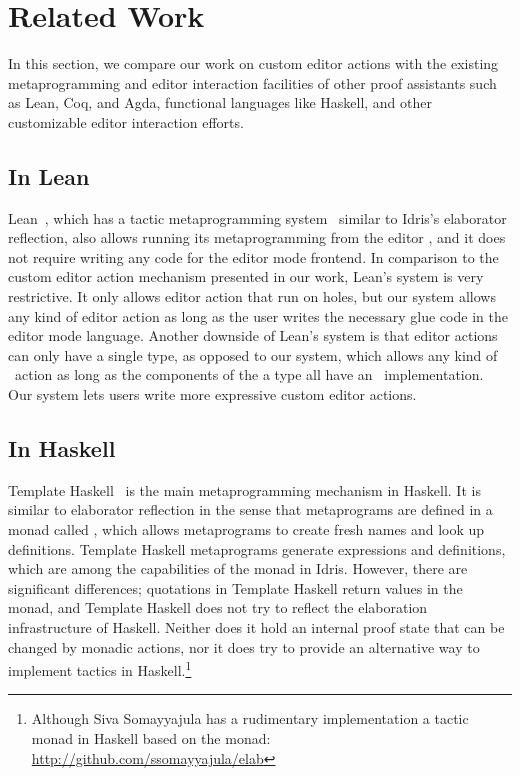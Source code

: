 \section{Related Work} \label{sec:relatedwork}

In this section, we compare our work on custom editor actions with the existing
metaprogramming and editor interaction facilities of other proof assistants
such as Lean, Coq, and Agda, functional languages like Haskell, and other
customizable editor interaction efforts.

\subsection{In Lean}

Lean~\cite{lean}, which has a tactic metaprogramming system~\cite{leanmeta}
similar to Idris's elaborator reflection, also allows running its
metaprogramming from the editor , and it does not require writing any code for
the editor mode frontend.
In comparison to the custom editor action mechanism presented in our work, Lean's
system is very restrictive. It only allows editor action that run on holes, but
our system allows any kind of editor action as long as the user writes the
necessary glue code in the editor mode language. Another downside of Lean's
system is that editor actions can only have a single type, as opposed to our
system, which allows any kind of \Elab\ action as long as the components of the
a type all have an \Editorable\ implementation. Our system lets users write
more expressive custom editor actions.

\subsection{In Haskell}

Template Haskell~\cite{th} is the main metaprogramming mechanism in Haskell.
It is similar to elaborator reflection in the sense that metaprograms are
defined in a monad called , which allows metaprograms to create fresh
names and look up definitions.
Template Haskell metaprograms generate expressions and definitions, which are
among the capabilities of the \Elab{} monad in Idris.
However, there are significant differences;
quotations in Template Haskell return values in the  monad, and Template
Haskell does not try to reflect the elaboration infrastructure of
Haskell.
Neither does it hold an internal proof state that can be changed by monadic
actions, nor it does try to provide an alternative way to implement tactics in
Haskell.\footnote{Although Siva Somayyajula has a rudimentary
implementation a tactic monad in Haskell based on the  monad:
\url{http://github.com/ssomayyajula/elab}}

